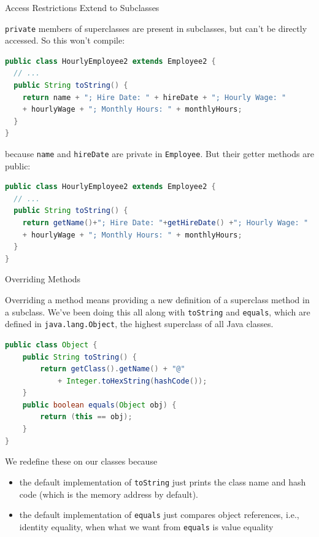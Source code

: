 \documentclass{beamer}
\begin{document}
\begin{frame}[fragile]{Access Restrictions Extend to Subclasses}


{\tt private} members of superclasses are present in subclasses, but can't be directly accessed.  So this won't compile:
\vspace{-.05in}
\begin{lstlisting}[language=Java]
public class HourlyEmployee2 extends Employee2 {
  // ...
  public String toString() {
    return name + "; Hire Date: " + hireDate + "; Hourly Wage: "
    + hourlyWage + "; Monthly Hours: " + monthlyHours;
  }
}
\end{lstlisting}
because {\tt name} and {\tt hireDate} are private in {\tt Employee}.  But their getter methods are public:
\vspace{-.05in}
\begin{lstlisting}[language=Java]
public class HourlyEmployee2 extends Employee2 {
  // ...
  public String toString() {
    return getName()+"; Hire Date: "+getHireDate() +"; Hourly Wage: "
    + hourlyWage + "; Monthly Hours: " + monthlyHours;
  }
}
\end{lstlisting}


\end{frame}

\begin{frame}[fragile]{Overriding Methods}

\vspace{-.05in}
Overriding a method means providing a new definition of a superclass method in a subclass.  We've been doing this all along with {\tt toString} and {\tt equals}, which are defined in {\tt java.lang.Object}, the highest superclass of all Java classes.
\vspace{-.05in}
\begin{lstlisting}[language=Java]
public class Object {
    public String toString() {
        return getClass().getName() + "@" 
            + Integer.toHexString(hashCode());
    }
    public boolean equals(Object obj) {
        return (this == obj);
    }
}
\end{lstlisting}
\vspace{-.1in}
We redefine these on our classes because
\begin{itemize}
\item the default implementation of {\tt toString} just prints the class name and hash code (which is the memory address by default).
\item the default implementation of {\tt equals} just compares object references, i.e., identity equality, when what we want from {\tt equals} is value equality
\end{itemize}


\end{frame}
\end{document}
